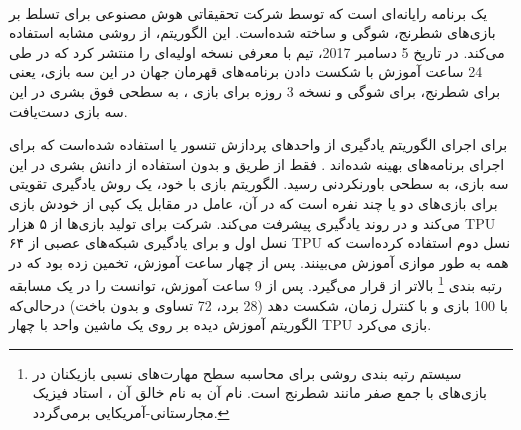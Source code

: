    
   

%
  
  

\paragraph{}
یک برنامه رایانه‌ای است که توسط شرکت تحقیقاتی هوش مصنوعی
 برای تسلط بر بازی‌های شطرنج، شوگی و 
ساخته شده‌است. این الگوریتم، از روشی مشابه
  استفاده می‌کند. در تاریخ 5 دسامبر 2017، تیم
  با معرفی
   نسخه اولیه‌ای را منتشر کرد که در طی 24 ساعت آموزش با شکست دادن برنامه‌های قهرمان جهان در این سه بازی، یعنی
    برای شطرنج،
برای شوگی و نسخه 3 روزه
برای بازی 
،
به سطحی فوق بشری در این سه بازی دست‌یافت. 

برای اجرای الگوریتم یادگیری
از واحدهای پردازش تنسور 
یا 
استفاده شده‌است که برای اجرای برنامه‌های
بهینه شده‌اند
\cite{silver2017}.
  فقط از طریق 
و بدون استفاده از دانش بشری در این سه بازی، به سطحی باورنکردنی رسید. الگوریتم بازی با خود، یک روش یادگیری تقویتی برای بازی‌های دو یا چند نفره است که در آن، عامل در مقابل یک کپی از خودش بازی می‌کند و در روند یادگیری پیشرفت می‌کند. شرکت
  برای تولید  بازی‌ها از ۵ هزار TPU نسل اول و برای یادگیری شبکه‌های عصبی از ۶۴ TPU نسل دوم استفاده کرده‌است که همه به طور موازی آموزش می‌بینند.
پس از چهار ساعت آموزش،
  تخمین زده بود که
    در رتبه بندی
\footnote{سیستم رتبه بندی
	  روشی برای محاسبه سطح مهارت‌های نسبی بازیکنان در بازی‌های با جمع صفر مانند شطرنج است. نام آن به نام خالق آن
،
استاد فیزیک مجارستانی-آمریکایی برمی‌گردد.}
بالاتر از
  قرار می‌گیرد. پس از 9 ساعت آموزش، توانست
را در یک مسابقه با 100 بازی و با کنترل زمان، شکست دهد (28 برد، 72 تساوی و بدون باخت) 
\cite{silver2017} \cite{knapton2017entire} \cite{superhuman2017}
درحالی‌که الگوریتم آموزش دیده بر روی یک ماشین واحد با چهار TPU بازی می‌کرد.

